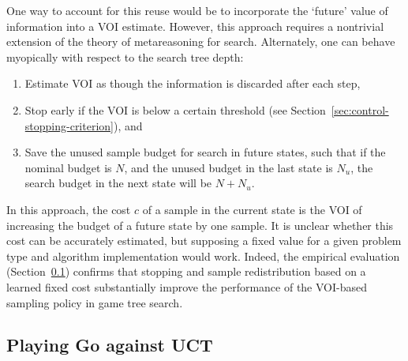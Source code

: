 \documentclass[]{article}
\newcommand{\secref}[1]{Section~\ref{#1}}
\begin{document}
One way to account for this reuse would be to incorporate the
`future' value of information into a VOI estimate. However, this 
approach requires a nontrivial extension of the theory of metareasoning for search.
Alternately, one can behave myopically with respect to the search tree depth:
\begin{enumerate}
\item Estimate VOI as though the information is discarded after each step,
\item Stop early if the VOI is below a certain threshold
   (see \secref{sec:control-stopping-criterion}), and
\item Save the unused sample budget for search in future states, such that
   if the nominal budget is $N$, and the unused budget in the last state
   is $N_u$, the search budget in the next state will be $N+N_u$.
\end{enumerate}
In this approach, the cost $c$ of a sample in the current state is the
VOI of increasing the budget of a future state by one sample.  It is
unclear whether this cost can be accurately estimated, but supposing
a fixed value for a given problem type and algorithm implementation
would work. Indeed, the empirical evaluation (\secref{sec:emp-go})
confirms that stopping and sample redistribution based on a learned
fixed cost  substantially improve the performance of the VOI-based
sampling policy in game tree search.


\subsection{Playing Go against UCT}
\label{sec:emp-go}
\end{document}
